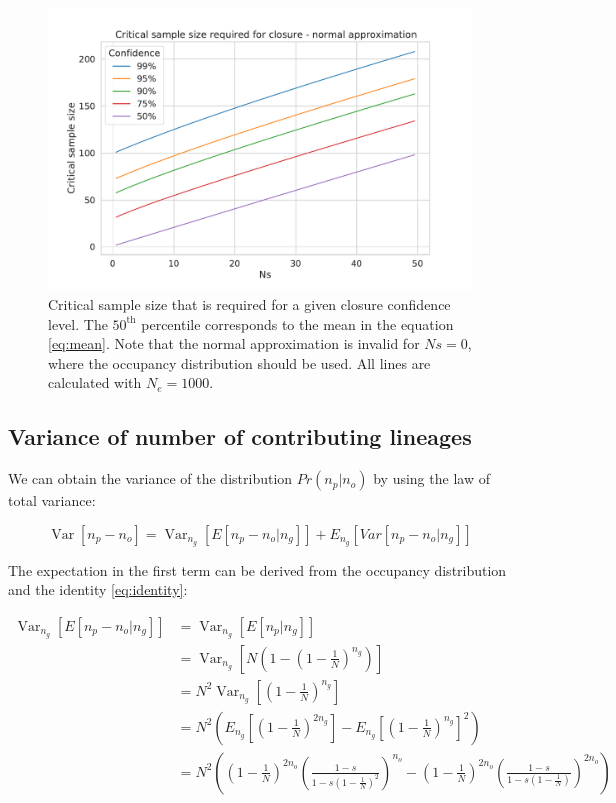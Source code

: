 \documentclass[review]{elsarticle}
\newcommand{\Var}{\operatorname{Var}}
\begin{document}
\begin{figure}
  \centering
  \includegraphics[width=\textwidth]{fig/critical_normal.pdf}
  \caption{Critical sample size that is required for a given closure confidence level. The $50^\text{th}$ percentile corresponds to the mean in the equation \eqref{eq:mean}. Note that the normal approximation is invalid for $Ns=0$, where the occupancy distribution should be used. All lines are calculated with $N_e=1000$.}
  \label{fig:apx:critical-fraction}
\end{figure}

\subsection{Variance of number of contributing lineages}
\label{subsec:apx:variance}

We can obtain the variance of the distribution $Pr(n_p | n_o)$ by using the law of total variance:

\begin{equation}
  \label{eq:apx:var}
\Var\left[n_p-n_o \right] = \Var_{n_g}\left[E\left[n_p-n_o | n_g \right]\right]+  E_{n_g}\left[Var\left[n_p-n_o | n_g \right]\right] 
\end{equation}

The expectation in the first term can be derived from the occupancy distribution and the identity
\ref{eq:identity}:

\begin{equation}
\begin{split}
\Var_{n_g}\left[E\left[n_p-n_o | n_g \right]\right] &= \Var_{n_g}\left[E\left[n_p| n_g \right]\right] \\
&= \Var_{n_g}\left[N\left(1-(1-\frac{1}{N})^{n_g} \right) \right] \\ 
&= N^2 \Var_{n_g}\left[(1-\frac{1}{N})^{n_g} \right] \\
&= N^2 \left( E_{n_g}\left[(1-\frac{1}{N})^{2n_g} \right] - E_{n_g}\left[(1-\frac{1}{N})^{n_g} \right]^2\right) \\
&= N^2 \left( \left(1-\frac{1}{N}\right)^{2n_o} \left(\frac{1-s}{1-s  \left(1-\frac{1}{N}\right)^2}\right)^{n_o} 
-   \left(1-\frac{1}{N}\right)^{2n_o} \left(\frac{1-s}{1-s  \left(1-\frac{1}{N}\right)}\right)^{2n_o} \right) \\
\end{split}
\end{equation}
\end{document}
